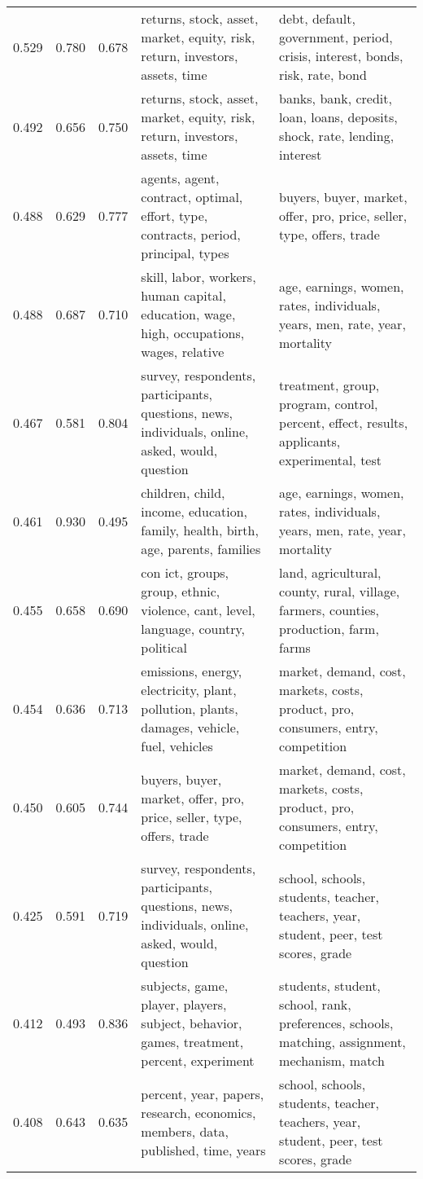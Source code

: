 \begin{tabular}{cccp{5cm}p{5cm}}
0.529 & 0.780 & 0.678 & returns, stock, asset, market, equity, risk, return, investors, assets, time & debt, default, government, period, crisis, interest, bonds, risk, rate, bond \\
0.492 & 0.656 & 0.750 & returns, stock, asset, market, equity, risk, return, investors, assets, time & banks, bank, credit, loan, loans, deposits, shock, rate, lending, interest \\
0.488 & 0.629 & 0.777 & agents, agent, contract, optimal, effort, type, contracts, period, principal, types & buyers, buyer, market, offer, pro, price, seller, type, offers, trade \\
0.488 & 0.687 & 0.710 & skill, labor, workers, human capital, education, wage, high, occupations, wages, relative & age, earnings, women, rates, individuals, years, men, rate, year, mortality \\
0.467 & 0.581 & 0.804 & survey, respondents, participants, questions, news, individuals, online, asked, would, question & treatment, group, program, control, percent, effect, results, applicants, experimental, test \\
0.461 & 0.930 & 0.495 & children, child, income, education, family, health, birth, age, parents, families & age, earnings, women, rates, individuals, years, men, rate, year, mortality \\
0.455 & 0.658 & 0.690 & con ict, groups, group, ethnic, violence, cant, level, language, country, political & land, agricultural, county, rural, village, farmers, counties, production, farm, farms \\
0.454 & 0.636 & 0.713 & emissions, energy, electricity, plant, pollution, plants, damages, vehicle, fuel, vehicles & market, demand, cost, markets, costs, product, pro, consumers, entry, competition \\
0.450 & 0.605 & 0.744 & buyers, buyer, market, offer, pro, price, seller, type, offers, trade & market, demand, cost, markets, costs, product, pro, consumers, entry, competition \\
0.425 & 0.591 & 0.719 & survey, respondents, participants, questions, news, individuals, online, asked, would, question & school, schools, students, teacher, teachers, year, student, peer, test scores, grade \\
0.412 & 0.493 & 0.836 & subjects, game, player, players, subject, behavior, games, treatment, percent, experiment & students, student, school, rank, preferences, schools, matching, assignment, mechanism, match \\
0.408 & 0.643 & 0.635 & percent, year, papers, research, economics, members, data, published, time, years & school, schools, students, teacher, teachers, year, student, peer, test scores, grade \\

\end{tabular}
